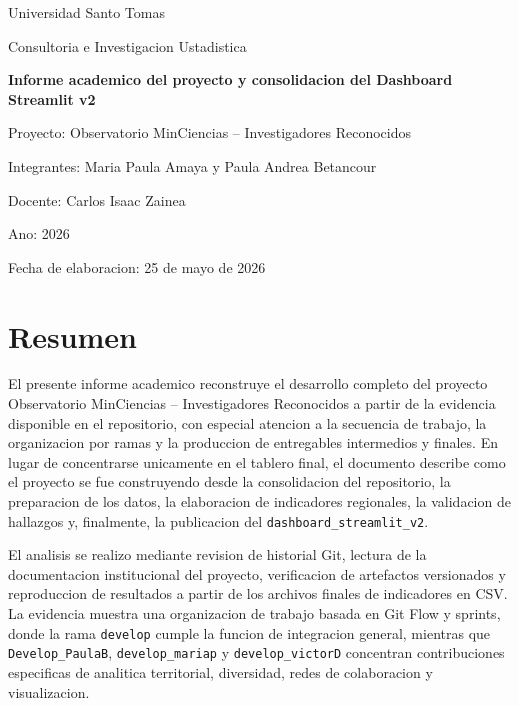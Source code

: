 \documentclass[12pt,letterpaper]{article}
\begin{document}
\begin{titlepage}
    \centering
    {\Large Universidad Santo Tomas\par}
    \vspace{0.5cm}
    {\large Consultoria e Investigacion Ustadistica\par}
    \vspace{1.8cm}
    {\LARGE \textbf{Informe academico del proyecto y consolidacion del Dashboard Streamlit v2}\par}
    \vspace{0.9cm}
    {\large Proyecto: Observatorio MinCiencias -- Investigadores Reconocidos\par}
    \vspace{0.9cm}
    {\large Integrantes: Maria Paula Amaya y Paula Andrea Betancour\par}
    {\large Docente: Carlos Isaac Zainea\par}
    {\large Ano: 2026\par}
    \vfill
    {\large Fecha de elaboracion: 25 de mayo de 2026\par}
\end{titlepage}

\tableofcontents
\newpage

\section{Resumen}

El presente informe academico reconstruye el desarrollo completo del proyecto Observatorio MinCiencias -- Investigadores Reconocidos a partir de la evidencia disponible en el repositorio, con especial atencion a la secuencia de trabajo, la organizacion por ramas y la produccion de entregables intermedios y finales. En lugar de concentrarse unicamente en el tablero final, el documento describe como el proyecto se fue construyendo desde la consolidacion del repositorio, la preparacion de los datos, la elaboracion de indicadores regionales, la validacion de hallazgos y, finalmente, la publicacion del \texttt{dashboard\_streamlit\_v2}.

El analisis se realizo mediante revision de historial Git, lectura de la documentacion institucional del proyecto, verificacion de artefactos versionados y reproduccion de resultados a partir de los archivos finales de indicadores en CSV. La evidencia muestra una organizacion de trabajo basada en Git Flow y sprints, donde la rama \texttt{develop} cumple la funcion de integracion general, mientras que \texttt{Develop\_PaulaB}, \texttt{develop\_mariap} y \texttt{develop\_victorD} concentran contribuciones especificas de analitica territorial, diversidad, redes de colaboracion y visualizacion.
\end{document}

